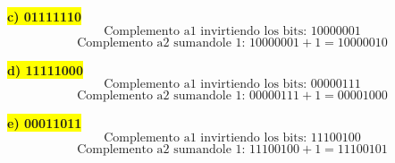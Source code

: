 \documentclass[a4paper,12pt]{article}
\begin{document}
	\begin{center}
		\colorbox{yellow}{{\textbf{c) 01111110 }}}
		\[
		\text{Complemento a1 invirtiendo los bits: } 10000001
		\]
		\[
		\text{Complemento a2 sumandole 1: } 10000001 + 1 = 10000010
		\]
	\end{center}

		\begin{center}
		\colorbox{yellow}{{\textbf{d) 11111000 }}}
		\[
		\text{Complemento a1 invirtiendo los bits: } 00000111
		\]
		\[
		\text{Complemento a2 sumandole 1: } 00000111 + 1 = 00001000
		\]
	\end{center}

		\begin{center}
		\colorbox{yellow}{{\textbf{e) 00011011 }}}
		\[
		\text{Complemento a1 invirtiendo los bits: } 11100100
		\]
		\[
		\text{Complemento a2 sumandole 1: } 11100100 + 1 = 11100101
		\]
	\end{center}



















	
\end{document}

